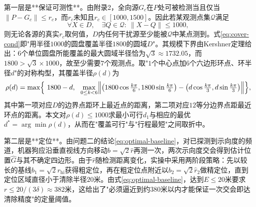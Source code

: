 \documentclass[12pt,a4paper]{ctexart}
\begin{document}
第一层是**保证可测性**。由附录2，全向源$G_c$在$P$处可被检测当且仅当$\lVert P-G_c\rVert\le r_c$，而$r_c$未知且$r_c\in[1000,1500]$。因此若某观测点集$\mathcal{Q}$满足
\begin{equation}
\forall X\in D,\quad \exists Q\in\mathcal{Q}:\ \lVert X-Q\rVert\le 1000,
\label{eq:cover-cond}
\end{equation}
则无论各源的真实$r_c$取何值，$D$内任何干扰源至少能被$\mathcal{Q}$中某点测到。式\eqref{eq:cover-cond}即"用半径$1000$的圆盘覆盖半径$1800$的圆域$D$"。其规模下界由Kershner定理给出：$6$个单位圆盘所能覆盖的最大圆域半径恰为$\sqrt3\approx1732.05$，而$1800>\sqrt3\times1000$，故至少需要$7$个观测点。取"$1$个中心点加$6$个六边形环点、环半径$d$"的对称构型，其覆盖半径$\rho(d)$为
\begin{equation}
\rho(d)=\max\Bigl\{\ 1800-d,\ \ \max_{0\le k<6}\Bigl\lVert \bigl(1800\cos\tfrac{k\pi}{6},1800\sin\tfrac{k\pi}{6}\bigr)-\bigl(d\cos\tfrac{k\pi}{3},d\sin\tfrac{k\pi}{3}\bigr)\Bigr\rVert \Bigr\},
\label{eq:rho-d}
\end{equation}
其中第一项对应$D$的边界点距环上最近点的距离，第二项对应$12$等分边界点距最近环点的距离。本文对$\rho(d)\le1000$求最小可行$d_1$与相应的最优$d^{*}=\arg\min\rho(d)$，从而在"覆盖可行"与"行程最短"之间取折中。

第二层是**定位**。由问题二的结论\eqref{eq:optimal-baseline}，对已探测到示向度的频道，机器狗应沿垂直视线方向移动$b=\sqrt2\hat r$再测一次，两次示向度交会得到估计位置$\hat G$与其不确定四边形。由于$\hat r$随检测距离变化，实操中采用两阶段策略：先以较长的基线$b_1=\sqrt2 r_{\mathrm{hi}}$获得粗定位，再在粗定位点附近以$b_2=\sqrt2\hat r_2$做精定位，直到定位区域直径小于清除半径$20$米。由式\eqref{eq:optimal-baseline}，达到$E\le20$米要求$r\le20/(3\delta)\approx382$米，这给出了"必须逼近到约$380$米以内才能保证一次交会即达清除精度"的定量阈值。
\end{document}
